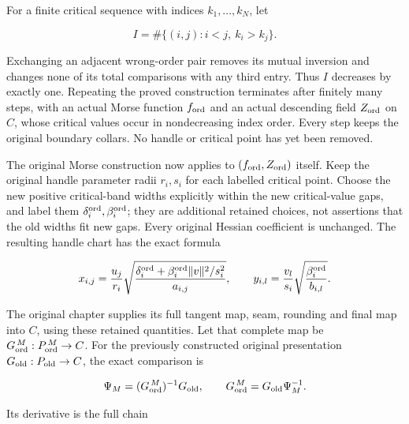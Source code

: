 For a finite critical sequence with indices \(k_1,\ldots,k_N\), let

\begin{equation}
I=\#\{(i,j):i<j,\ k_i>k_j\}.
 \label{courseIII:morse-trajectories-and-critical-value-lowering:eq:5.2}
\end{equation}

Exchanging an adjacent wrong-order pair removes its mutual inversion and changes none of its total comparisons with any third entry. Thus \(I\) decreases by exactly one. Repeating the proved construction terminates after finitely many steps, with an actual Morse function \(f_{\rm ord}\) and an actual descending field \(Z_{\rm ord}\) on \(C\), whose critical values occur in nondecreasing index order. Every step keeps the original boundary collars. No handle or critical point has yet been removed.

The original Morse construction now applies to \((f_{\rm ord},Z_{\rm ord})\) itself. Keep the original handle parameter radii \(r_i,s_i\) for each labelled critical point. Choose the new positive critical-band widths explicitly within the new critical-value gaps, and label them \(\delta_i^{\rm ord},\beta_i^{\rm ord}\); they are additional retained choices, not assertions that the old widths fit new gaps. Every original Hessian coefficient is unchanged. The resulting handle chart has the exact formula

\begin{equation}
x_{i,j}
 =\frac{u_j}{r_i}
   \sqrt{\frac{\delta_i^{\rm ord}
          +\beta_i^{\rm ord}\|v\|^2/s_i^2}{a_{i,j}}},
 \qquad
 y_{i,l}=\frac{v_l}{s_i}
              \sqrt{\frac{\beta_i^{\rm ord}}{b_{i,l}}}.
 \label{courseIII:morse-trajectories-and-critical-value-lowering:eq:5.3}
\end{equation}

The original chapter supplies its full tangent map, seam, rounding and final map into \(C\), using these retained quantities. Let that complete map be
\(G_{\rm ord}^{\,M}:P_{\rm ord}^{\,M}\to C\). For the previously constructed original presentation \(G_{\rm old}:P_{\rm old}\to C\), the exact comparison is

\begin{equation}
\Psi_M=(G_{\rm ord}^{\,M})^{-1}G_{\rm old},
 \qquad
 G_{\rm ord}^{\,M}=G_{\rm old}\Psi_M^{-1}.
 \label{courseIII:morse-trajectories-and-critical-value-lowering:eq:5.4}
\end{equation}

Its derivative is the full chain

